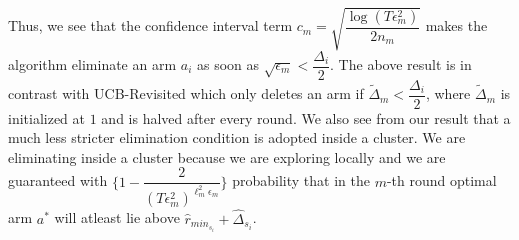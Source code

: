 \begin{remark}
	
	Thus, we see that the confidence interval term $c_{m}=\sqrt{\dfrac{\log (T\epsilon_{m}^{2})}{2 n_{m}}}$ makes the algorithm eliminate an arm $a_{i}$ as soon as $\sqrt{\epsilon_{m}}<\dfrac{\Delta_{i}}{2}$. The above result is in contrast with UCB-Revisited which only deletes an arm if $\tilde{\Delta}_{m}<\dfrac{\Delta_{i}}{2}$, where $\tilde{\Delta}_{m}$ is initialized at $1$ and is halved after every round. We also see from our result that a much less stricter elimination condition is adopted inside a cluster. We are eliminating inside a cluster because we are exploring locally and we are guaranteed with  $\bigg\lbrace 1- \dfrac{2}{(T\epsilon_{m}^{2})^{\ell_{m}^{2}\epsilon_{m}}} \bigg\rbrace$ probability that in the $m$-th round optimal arm $a^{*}$ will atleast lie above $\hat{r}_{min_{s_{i}}}+ \hat{\Delta}_{s_{i}}$. 
%
%
%
%
%	

\end{remark}
